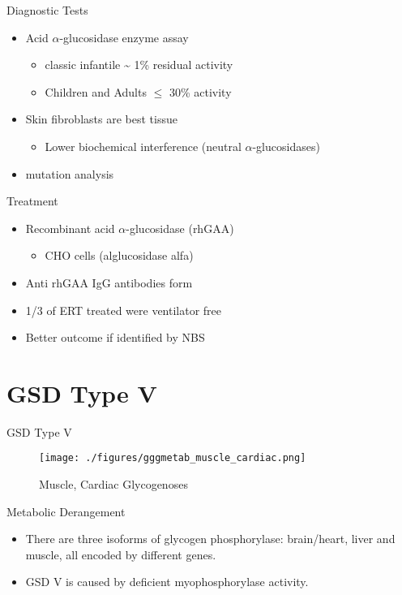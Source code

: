 \documentclass[presentation, smaller]{beamer}
\begin{document}
\begin{frame}[label={sec:org578087f}]{Diagnostic Tests}
\begin{itemize}
\item Acid \(\alpha\)-glucosidase enzyme assay
\begin{itemize}
\item classic infantile \textasciitilde{} 1\% residual activity
\item Children and Adults \(\le\) 30\% activity
\end{itemize}
\item Skin fibroblasts are best tissue
\begin{itemize}
\item Lower biochemical interference (neutral \(\alpha\)-glucosidases)
\end{itemize}
\item mutation analysis
\end{itemize}
\end{frame}
\begin{frame}[label={sec:orge3f163e}]{Treatment}
\begin{itemize}
\item Recombinant acid \(\alpha\)-glucosidase (rhGAA)
\begin{itemize}
\item CHO cells (alglucosidase alfa)
\end{itemize}
\item Anti rhGAA IgG antibodies form
\item 1/3 of ERT treated were ventilator free
\item Better outcome if identified by NBS
\end{itemize}
\end{frame}

\section{GSD Type V}
\label{sec:org6ce2f21}
\begin{frame}[label={sec:org8bf6228}]{GSD Type V}
\begin{figure}[htbp]
\centering
\texttt{[image: ./figures/gggmetab\_muscle\_cardiac.png]}
\caption[Muscle, Cardiac Glycogenoses]{\label{fig:orgb0d4e98}
Muscle, Cardiac Glycogenoses}
\end{figure}
\end{frame}

\begin{frame}[label={sec:org8922262}]{Metabolic Derangement}
\begin{itemize}
\item There are three isoforms of glycogen phosphorylase: brain/heart,
liver and muscle, all encoded by different genes.
\item GSD V is caused by deficient myophosphorylase activity.
\end{itemize}
\end{frame}
\end{document}
